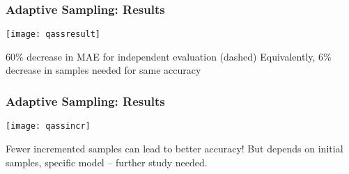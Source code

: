 \begin{frame}
    \frametitle{Adaptive Sampling: Results}
    \vspace{-10pt}
    \begin{center}
    \texttt{[image: qassresult]}
    \end{center}
    
    $60\%$ decrease in MAE for independent evaluation (dashed) \newline
    Equivalently, $6\%$ decrease in samples needed for same accuracy

\end{frame}


\begin{frame}
    \frametitle{Adaptive Sampling: Results}
    \vspace{-10pt}
    \begin{center}
    \texttt{[image: qassincr]}
    \end{center}
    
    Fewer incremented samples can lead to better accuracy! \newline
    But depends on initial samples, specific model -- further study needed.

\end{frame}

